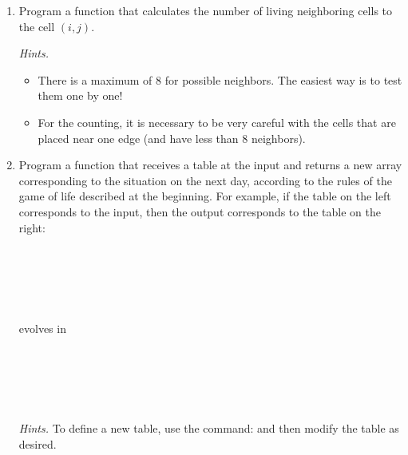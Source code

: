 \documentclass[11pt,class=report,crop=false]{standalone}
\begin{document}
\begin{activite}[Evolution]


\begin{enumerate}
  \item Program a function  that calculates the number of living neighboring cells to the cell $(i,j)$.
  
  \emph{Hints.}
  \begin{itemize}
    \item There is a maximum of $8$ for possible neighbors. The easiest way is to test them one by one!
    \item For the counting, it is necessary to be very careful with the cells that are placed near one edge (and have less than $8$ neighbors).
  \end{itemize}
  
  \item Program a function  that receives a table at the input and returns a new array corresponding to the situation on the next day, according to the rules of the game of life described at the beginning.
 For example, if the table on the left corresponds to the input, then the output corresponds to the table on the right:

\begin{center}
\begin{minipage}{0.3\textwidth}
\begin{center}
\\
\\
\\
\\
\end{center}
\end{minipage} 
 evolves in  
\begin{minipage}{0.3\textwidth}
\begin{center}
\\
\\
\\
\\
\end{center}
\end{minipage} 
\end{center}

  \emph{Hints.} To define a new table, use the command:  
  and then modify the table as desired.

\end{enumerate}
\end{activite}
\end{document}
